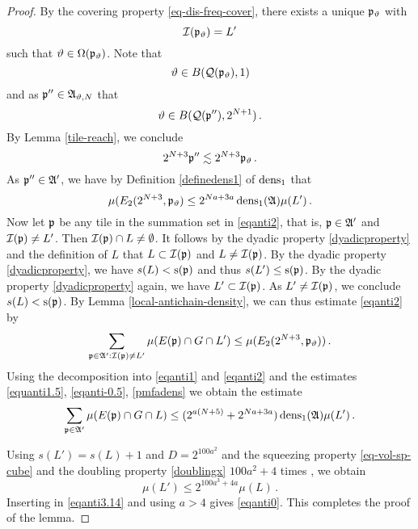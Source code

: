 {\begin{proof}
By the covering property \eqref{eq-dis-freq-cover}, there exists a unique ${\mathfrak p}_{{\vartheta}}$ with
\begin{equation*}
    {\mathcal{I}}({\mathfrak p}_{{\vartheta}})=L'
\end{equation*}
such that ${\vartheta}\in {\Omega}({\mathfrak p}_{{\vartheta}})$.
Note that
\begin{equation}
    {\vartheta}\in B({\mathcal{Q}}({\mathfrak p}_{{\vartheta}}), 1)
\end{equation}
and as  ${\mathfrak p}'' \in \mathfrak{A}_{{\vartheta},N}$ that
\begin{equation}
    {\vartheta} \in B({\mathcal{Q}}({\mathfrak p}''), 2^{N+1})\, .
\end{equation}
By Lemma \ref{tile-reach}, we conclude
\begin{equation}
    2^{N+3}{\mathfrak p}''  \lesssim  2^{N+3}{\mathfrak p}_{{\vartheta}} \, .
\end{equation}
As ${\mathfrak p}''\in \mathfrak{A}'$, we have by Definition
\eqref{definedens1} of $\operatorname{\operatorname{dens}}_1$ that
\begin{equation}\label{pmfadens}
   {\mu(E_2(2^{N+3}, {\mathfrak p}_{{\vartheta}})}\le 2^{Na+3a}\operatorname{\operatorname{dens}}_1(\mathfrak{A}) {\mu(L')}\, .
\end{equation}
Now let ${\mathfrak p}$ be any tile in the summation set in \eqref{eqanti2}, that is, ${\mathfrak p}\in \mathfrak{A}'$ and ${\mathcal{I}}({\mathfrak p})\neq L'$.
Then ${\mathcal{I}}({\mathfrak p})\cap L\neq \emptyset$. It follows by the dyadic property \eqref{dyadicproperty}
and the definition of $L$ that
$L\subset {\mathcal{I}}({\mathfrak p})$ and $L\neq {\mathcal{I}}({\mathfrak p})$. By the dyadic property \eqref{dyadicproperty}, we have
$s(L)<{\mathrm{s}}({\mathfrak p})$ and thus $s(L')\le {\mathrm{s}}({\mathfrak p})$. By the dyadic property
   \eqref{dyadicproperty} again, we have $L'\subset {\mathcal{I}}({\mathfrak p})$.
As $L'\neq {\mathcal{I}}({\mathfrak p})$, we conclude $s(L)<{\mathrm{s}}({\mathfrak p})$.
By Lemma \ref{local-antichain-density}, we can thus estimate \eqref{eqanti2} by
\begin{equation}\label{eqanti0.5}
    \sum_{{\mathfrak p}\in\mathfrak{A}':{\mathcal{I}}({\mathfrak p})\neq L'}\mu(E({\mathfrak p})\cap G\cap L')
    \le  \mu (E_2(2^{N+3},{\mathfrak p}_{{\vartheta}}))\, .
\end{equation}
Using the decomposition
into \eqref{eqanti1} and
\eqref{eqanti2} and the estimates
\eqref{equanti1.5},
\eqref{eqanti-0.5},
\eqref{pmfadens} we obtain the estimate
\begin{equation}\label{eqanti3.14}
\sum_{{\mathfrak p}\in\mathfrak{A}'}\mu(E({\mathfrak p})\cap G \cap L)
    \le (2^{a(N+5)}+2^{Na+3a})\operatorname{\operatorname{dens}}_1(\mathfrak{A})\mu(L')\,.
\end{equation}

Using $s(L')=s(L)+1$ and $D=2^{100a^2}$ and the
squeezing property \eqref{eq-vol-sp-cube}
and the doubling property \eqref{doublingx} $100a^2+4$ times , we obtain
\begin{equation}
    \mu(L')\le 2^{100a^3+4a}\mu(L)\, .
\end{equation}
Inserting in \eqref{eqanti3.14} and using $a>4$ gives \eqref{eqanti0}.
This completes the proof of the lemma.
\end{proof}



}
